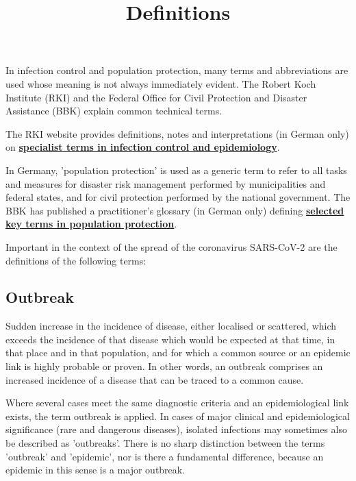 \documentclass{article}
\begin{document}
\title{Definitions}

\maketitle


In infection control and population protection, many terms and abbreviations are used whose meaning is not always immediately evident. The Robert Koch Institute (RKI) and the Federal Office for Civil Protection and Disaster Assistance (BBK) explain common technical terms.


The RKI website provides definitions, notes and interpretations (in German only) on \textbf{\href{https://www.rki.de/DE/Content/Service/Publikationen/Fachwoerterbuch_Infektionsschutz.pdf}{specialist terms in infection control and epidemiology}}.


In Germany, 'population protection' is used as a generic term to refer to all tasks and measures for disaster risk management performed by municipalities and federal states, and for civil protection performed by the national government. The BBK has published a practitioner's glossary (in German only) defining \textbf{\href{https://www.bbk.bund.de/SharedDocs/Downloads/BBK/DE/Publikationen/Praxis_Bevoelkerungsschutz/Glossar_2018.pdf}{selected key terms in population protection}}.


Important in the context of the spread of the coronavirus SARS-CoV-2 are the definitions of the following terms:


\subsection{Outbreak}\label{H3878242}



Sudden increase in the incidence of disease, either localised or scattered, which exceeds the incidence of that disease which would be expected at that time, in that place and in that population, and for which a common source or an epidemic link is highly probable or proven. In other words, an outbreak comprises an increased incidence of a disease that can be traced to a common cause.


Where several cases meet the same diagnostic criteria and an epidemiological link exists, the term outbreak is applied. In cases of major clinical and epidemiological significance (rare and dangerous diseases), isolated infections may sometimes also be described as 'outbreaks'. There is no sharp distinction between the terms 'outbreak' and 'epidemic', nor is there a fundamental difference, because an epidemic in this sense is a major outbreak.
\end{document}
